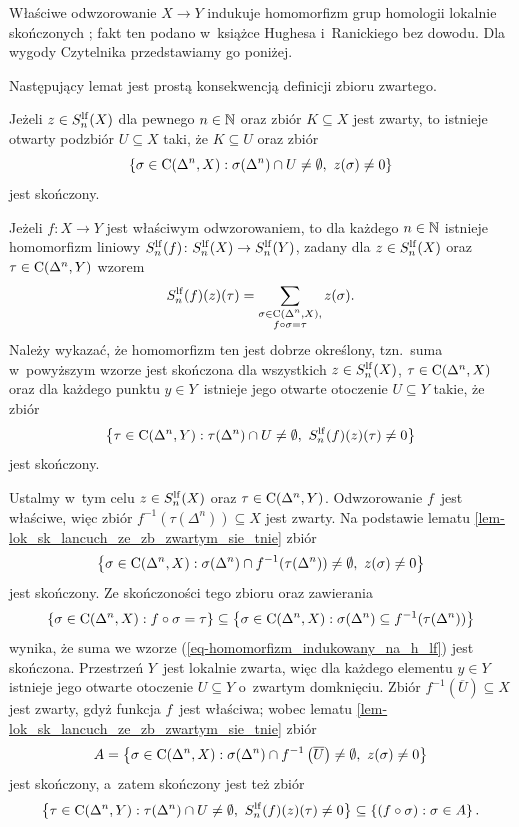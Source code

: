 Właściwe odwzorowanie $X\to Y$ indukuje homomorfizm grup homologii lokalnie skończonych \cite[Proposition 3.2]{Hughes96}; fakt ten podano w~książce Hughesa i~Ranickiego bez dowodu. Dla wygody Czytelnika przedstawiamy go poniżej.

Następujący lemat jest prostą konsekwencją definicji zbioru zwartego.
\begin{lem}\label{lem-lok_sk_lancuch_ze_zb_zwartym_sie_tnie}
Jeżeli $z\in S^{\mathrm{lf}}_n(X)$ dla pewnego $n\in\mathbb{N}$ oraz zbiór $K\subseteq X$ jest zwarty, to istnieje otwarty podzbiór $U\subseteq X$ taki, że $K\subseteq U$ oraz zbiór \[\{\sigma\in \Cont(\Delta^n,X):\sigma(\Delta^n)\cap U\not=\emptyset,\ z(\sigma)\not=0\}\] jest skończony.
\end{lem}

Jeżeli $f\colon X\to Y$ jest właściwym odwzorowaniem, to dla każdego $n\in\mathbb{N}$ istnieje homomorfizm liniowy $S_n^{\mathrm{lf}}(f)\colon S_n^{\mathrm{lf}}(X)\to S_n^{\mathrm{lf}}(Y)$, zadany dla $z\in S^{\mathrm{lf}}_n(X)$ oraz $\tau\in \operatorname{C}(\Delta^n,Y)$ wzorem \begin{equation}S_n^{\mathrm{lf}}(f)(z)(\tau)=\sum_{\substack{\sigma\in \operatorname{C}(\Delta^n,X),\\f\circ\sigma=\tau}} z(\sigma).\label{eq-homomorfizm_indukowany_na_h_lf}\end{equation}
Należy wykazać, że homomorfizm ten jest dobrze określony, tzn.~suma w~powyższym wzorze jest skończona dla wszystkich $z\in S^{\mathrm{lf}}_n(X)$, $\tau\in\operatorname{C}(\Delta^n,X)$ oraz dla każdego punktu $y\in Y$~istnieje jego otwarte otoczenie $U\subseteq Y$ takie, że zbiór \[\left\{\tau\in \Cont(\Delta^n,Y):\tau(\Delta^n)\cap U\not=\emptyset,\ S^\lf_n(f)(z)(\tau)\not=0\right\}\] jest skończony.

Ustalmy w~tym celu $z\in S^{\mathrm{lf}}_n(X)$ oraz $\tau\in \operatorname{C}(\Delta^n,Y)$. Odwzorowanie $f$~jest właściwe, więc zbiór $f^{-1}(\tau(\Delta^n))\subseteq X$ jest zwarty. Na podstawie lematu \ref{lem-lok_sk_lancuch_ze_zb_zwartym_sie_tnie} zbiór \[\left\{\sigma\in\operatorname{C}(\Delta^n,X):\sigma(\Delta^n)\cap f^{-1}(\tau(\Delta^n))\not=\emptyset,\ z(\sigma)\not=0\right\}\] jest skończony. Ze skończoności tego zbioru oraz zawierania \[\left\{\sigma\in\operatorname{C}(\Delta^n,X):f\circ\sigma=\tau\right\}\subseteq \left\{\sigma\in\operatorname{C}(\Delta^n,X):\sigma(\Delta^n)\subseteq f^{-1}(\tau(\Delta^n))\right\}\] wynika, że suma we wzorze (\ref{eq-homomorfizm_indukowany_na_h_lf}) jest skończona. Przestrzeń $Y$~jest lokalnie zwarta, więc dla każdego elementu $y\in Y$ istnieje jego otwarte otoczenie $U\subseteq Y$ o~zwartym domknięciu. Zbiór $f^{-1}\left(\overline{U}\right)\subseteq X$ jest zwarty, gdyż funkcja $f$~jest właściwa; wobec lematu \ref{lem-lok_sk_lancuch_ze_zb_zwartym_sie_tnie} zbiór \[A=\left\{\sigma\in\Cont(\Delta^n,X):\sigma(\Delta^n)\cap f^{-1}\left(\overline{U}\right)\not=\emptyset,\ z(\sigma)\not=0\right\}\] jest skończony, a~zatem skończony jest też zbiór \[\left\{\tau\in\operatorname{C}(\Delta^n,Y):\tau(\Delta^n)\cap U\not=\emptyset,\ S^{\mathrm{lf}}_n(f)(z)(\tau)\not=0\right\}\subseteq \left\{(f\circ \sigma)
:\sigma\in A\right\}.\]

